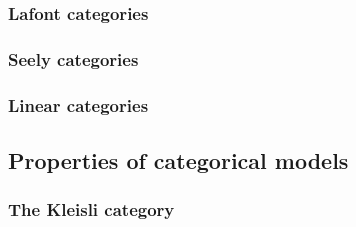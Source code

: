 \subsubsection{Lafont categories}\label{lafont-categories}

\subsubsection{Seely categories}\label{seely-categories}

\subsubsection{Linear categories}\label{linear-categories}

\subsection{Properties of categorical models}\label{properties-of-categorical-models}

\subsubsection{The Kleisli category}\label{the-kleisli-category}


